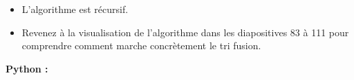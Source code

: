 \begin{Exercice} [20 minutes]
    \begin{conseil}
    \begin{itemize}
        \item L'algorithme est récursif. 
        \item Revenez à la visualisation de l'algorithme dans les diapositives 83 à 111 pour comprendre comment marche concrètement le tri fusion. 
    \end{itemize}
    
    \end{conseil}
    
    \begin{solution}
        \textbf{Python :}
         
    \end{solution}
\end{Exercice}



